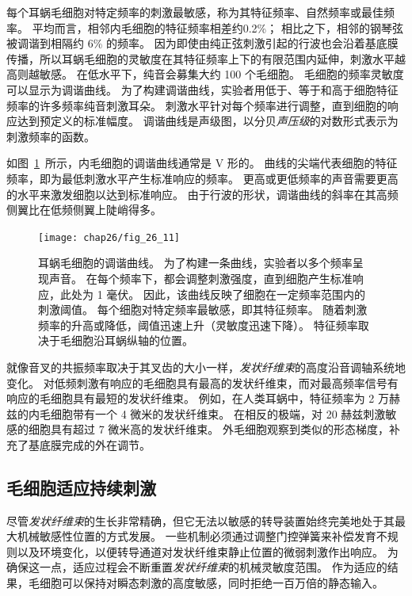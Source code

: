 每个耳蜗毛细胞对特定频率的刺激最敏感，称为其特征频率、自然频率或最佳频率。
平均而言，相邻内毛细胞的特征频率相差约0.2\%；
相比之下，相邻的钢琴弦被调谐到相隔约 6\% 的频率。 
因为即使由纯正弦刺激引起的行波也会沿着基底膜传播，所以耳蜗毛细胞的灵敏度在其特征频率上下的有限范围内延伸，刺激水平越高则越敏感。
在低水平下，纯音会募集大约 100 个毛细胞。
毛细胞的频率灵敏度可以显示为调谐曲线。
为了构建调谐曲线，实验者用低于、等于和高于细胞特征频率的许多频率纯音刺激耳朵。
刺激水平针对每个频率进行调整，直到细胞的响应达到预定义的标准幅度。
调谐曲线是声级图，以分贝\textit{声压级}的对数形式表示为刺激频率的函数。


如图~\ref{fig:26_11}~所示，内毛细胞的调谐曲线通常是 V 形的。
曲线的尖端代表细胞的特征频率，即为最低刺激水平产生标准响应的频率。
更高或更低频率的声音需要更高的水平来激发细胞以达到标准响应。
由于行波的形状，调谐曲线的斜率在其高频侧翼比在低频侧翼上陡峭得多。


\begin{figure}[htbp]
	\centering
	\texttt{[image: chap26/fig\_26\_11]}
	\caption{耳蜗毛细胞的调谐曲线。
		为了构建一条曲线，实验者以多个频率呈现声音。
		在每个频率下，都会调整刺激强度，直到细胞产生标准响应，此处为 1 毫伏。
		因此，该曲线反映了细胞在一定频率范围内的刺激阈值。
		每个细胞对特定频率最敏感，即其特征频率。
		随着刺激频率的升高或降低，阈值迅速上升（灵敏度迅速下降）。
		特征频率取决于毛细胞沿耳蜗纵轴的位置。}
	\label{fig:26_11}
\end{figure}


就像音叉的共振频率取决于其叉齿的大小一样，\textit{发状纤维束}的高度沿音调轴系统地变化。
对低频刺激有响应的毛细胞具有最高的发状纤维束，而对最高频率信号有响应的毛细胞具有最短的发状纤维束。
例如，在人类耳蜗中，特征频率为 2 万赫兹的内毛细胞带有一个 4 微米的发状纤维束。
在相反的极端，对 20 赫兹刺激敏感的细胞具有超过 7 微米高的发状纤维束。
外毛细胞观察到类似的形态梯度，补充了基底膜完成的外在调节。



\subsection{毛细胞适应持续刺激}

尽管\textit{发状纤维束}的生长非常精确，但它无法以敏感的转导装置始终完美地处于其最大机械敏感性位置的方式发展。
一些机制必须通过调整门控弹簧来补偿发育不规则以及环境变化，以便转导通道对发状纤维束静止位置的微弱刺激作出响应。
为确保这一点，适应过程会不断重置\textit{发状纤维束}的机械灵敏度范围。
作为适应的结果，毛细胞可以保持对瞬态刺激的高度敏感，同时拒绝一百万倍的静态输入。


